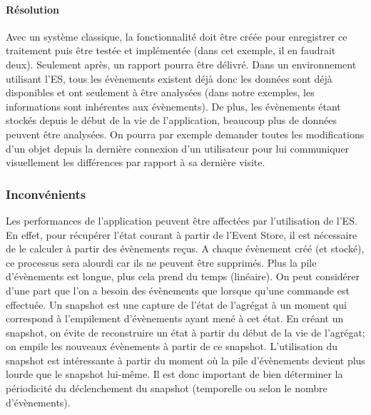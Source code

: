 \paragraph{Résolution} Avec un système classique, la fonctionnalité doit être 
créée pour enregistrer ce traitement puis être testée et implémentée (dans cet 
exemple, il en faudrait deux). Seulement après, un rapport pourra être délivré. 
Dans un environnement utilisant l'\gls{ES}, tous les évènements existent déjà 
donc les données sont déjà disponibles et ont seulement à être analysées 
(dans 
notre exemples, les informations sont inhérentes aux évènements). De plus, les 
évènements étant stockés depuis le début de la vie de l'application, beaucoup plus de données peuvent être analysées. On 
	pourra par 
exemple demander toutes les modifications d'un objet depuis la dernière 
connexion d'un utilisateur pour lui communiquer visuellement les différences par 
rapport à sa dernière visite.



\subsubsection{Inconvénients}
Les performances de l'application peuvent être affectées par l'utilisation de 
l'\gls{ES}. En effet, pour récupérer l'état courant à partir de l'Event Store, il est 
nécessaire de le calculer à partir des évènements reçus.
A chaque évènement créé (et stocké), ce processus sera alourdi car ils ne 
peuvent être supprimés. Plus la pile d'évènements est longue, plus cela prend 
du temps (linéaire). On peut considérer d'une part que l'on a besoin des 
évènements que lorsque qu'une commande est effectuée. Un \gls{snapshot} est une capture de l'état de l'agrégat à un 
moment qui correspond à l'empilement d'évènements ayant mené à cet état. En 
créant un \gls{snapshot}, on évite de reconstruire un état à partir du début de la 
vie de l'agrégat; on empile les nouveaux évènements à partir de ce snapshot. 
L'utilisation du \gls{snapshot} est intéressante à partir du moment où la pile 
d'évènements devient plus lourde que le \gls{snapshot} lui-même. Il est donc 
important de bien déterminer la périodicité du déclenchement du \gls{snapshot} 
(temporelle ou selon le nombre d'évènements).

